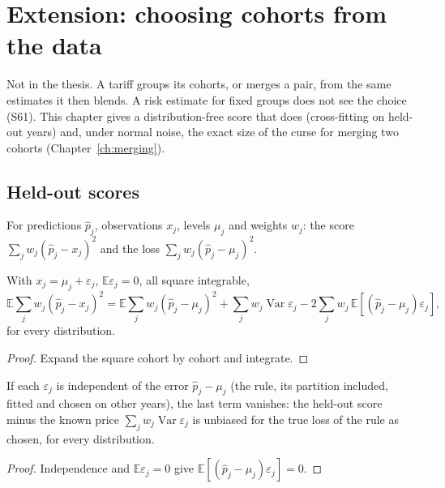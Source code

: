 \chapter{Extension: choosing cohorts from the data}\label{ch:selection}

Not in the thesis. A tariff groups its cohorts, or merges a pair, from the
same estimates it then blends. A risk estimate for fixed groups does not see
the choice (S61). This chapter gives a distribution-free score that does
(cross-fitting on held-out years) and, under normal noise, the exact size of
the curse for merging two cohorts (Chapter~\ref{ch:merging}).

\section{Held-out scores}

\begin{definition}\label{def:cv_score}
  \leanok
  For predictions $\hat p_j$, observations $x_j$, levels $\mu_j$ and weights
  $w_j$: the score $\sum_j w_j(\hat p_j - x_j)^2$ and the loss
  $\sum_j w_j(\hat p_j - \mu_j)^2$.
\end{definition}

\begin{theorem}\label{thm:integral_score}
  \leanok
  With $x_j = \mu_j + \varepsilon_j$, $\mathbb E\varepsilon_j = 0$, all square integrable,
  \[
    \mathbb E\sum_j w_j(\hat p_j - x_j)^2 = \mathbb E\sum_j w_j(\hat p_j - \mu_j)^2
    + \sum_j w_j \operatorname{Var}\varepsilon_j
    - 2\sum_j w_j\,\mathbb E[(\hat p_j - \mu_j)\varepsilon_j],
  \]
  for every distribution.
\end{theorem}
\begin{proof}
  \leanok
  Expand the square cohort by cohort and integrate.
\end{proof}

\begin{theorem}\label{thm:heldOutScore}
  \leanok
  If each $\varepsilon_j$ is independent of the error $\hat p_j - \mu_j$ (the rule,
  its partition included, fitted and chosen on other years), the last term
  vanishes: the held-out score minus the known price
  $\sum_j w_j\operatorname{Var}\varepsilon_j$ is unbiased for the true loss of the
  rule as chosen, for every distribution.
\end{theorem}
\begin{proof}
  \leanok
  Independence and $\mathbb E\varepsilon_j = 0$ give
  $\mathbb E[(\hat p_j - \mu_j)\varepsilon_j] = 0$.
\end{proof}

